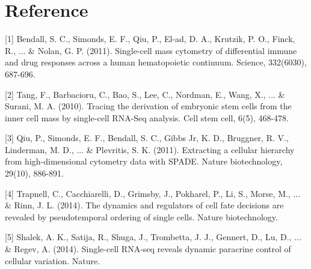 \documentclass[10pt,oneside]{article}\usepackage[]{graphicx}\usepackage[]{color}
\begin{document}
\section{Reference}
[1] Bendall, S. C., Simonds, E. F., Qiu, P., El-ad, D. A., Krutzik, P. O., Finck, R., ... \& Nolan, G. P. (2011). Single-cell mass cytometry of differential immune and drug responses across a human hematopoietic continuum. Science, 332(6030), 687-696.

[2] Tang, F., Barbacioru, C., Bao, S., Lee, C., Nordman, E., Wang, X., ... \& Surani, M. A. (2010). Tracing the derivation of embryonic stem cells from the inner cell mass by single-cell RNA-Seq analysis. Cell stem cell, 6(5), 468-478.

[3] Qiu, P., Simonds, E. F., Bendall, S. C., Gibbs Jr, K. D., Bruggner, R. V., Linderman, M. D., ... \& Plevritis, S. K. (2011). Extracting a cellular hierarchy from high-dimensional cytometry data with SPADE. Nature biotechnology, 29(10), 886-891.

[4] Trapnell, C., Cacchiarelli, D., Grimsby, J., Pokharel, P., Li, S., Morse, M., ... \& Rinn, J. L. (2014). The dynamics and regulators of cell fate decisions are revealed by pseudotemporal ordering of single cells. Nature biotechnology.

[5] Shalek, A. K., Satija, R., Shuga, J., Trombetta, J. J., Gennert, D., Lu, D., ... \& Regev, A. (2014). Single-cell RNA-seq reveals dynamic paracrine control of cellular variation. Nature.
\end{document}
